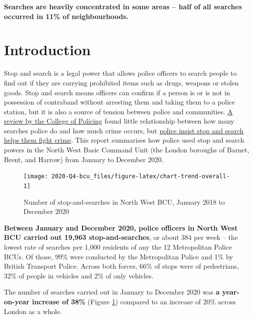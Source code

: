 \documentclass[
  a4paper,
  twoside, 11pt]{article}
\begin{document}
\textbf{\sffamily Searches are heavily concentrated in some areas -- half of all searches occurred in 11\% of neighbourhoods.}

\hypertarget{introduction}{%
\section{Introduction}\label{introduction}}

Stop and search is a legal power that allows police officers to search people to find out if they are carrying prohibited items such as drugs, weapons or stolen goods. Stop and search means officers can confirm if a person is or is not in possession of contraband without arresting them and taking them to a police station, but it is also a source of tension between police and communities. \href{https://whatworks.college.police.uk/Research/Documents/SS_and_crime_report.pdf}{A review by the College of Policing} found little relationship between how many searches police do and how much crime occurs, but \href{https://www.met.police.uk/advice/advice-and-information/st-s/stop-and-search/why-we-use-stop-and-search/}{police insist stop and search helps them fight crime}. This report summarises how police used stop and search powers in the North West Basic Command Unit (the London boroughs of Barnet, Brent, and Harrow) from January to December 2020.



\begin{figure}[h]

{\centering \texttt{[image: 2020-Q4-bcu\_files/figure-latex/chart-trend-overall-1]} 

}

\caption{Number of stop-and-searches in North West BCU, January 2018 to December 2020}\label{fig:chart-trend-overall}
\end{figure}

\textbf{Between January and December 2020, police officers in North West BCU carried out 19,963 stop-and-searches}, or about 384 per week -- the lowest rate of searches per 1,000 residents of any the 12 Metropolitan Police BCUs. Of those, 99\% were conducted by the Metropolitan Police and 1\% by British Transport Police. Across both forces, 66\% of stops were of pedestrians, 32\% of people in vehicles and 2\% of only vehicles.

The number of searches carried out in January to December 2020 was \textbf{a year-on-year increase of 38\%} (Figure \ref{fig:chart-trend-overall}) compared to an increase of 20\% across London as a whole.
\end{document}
